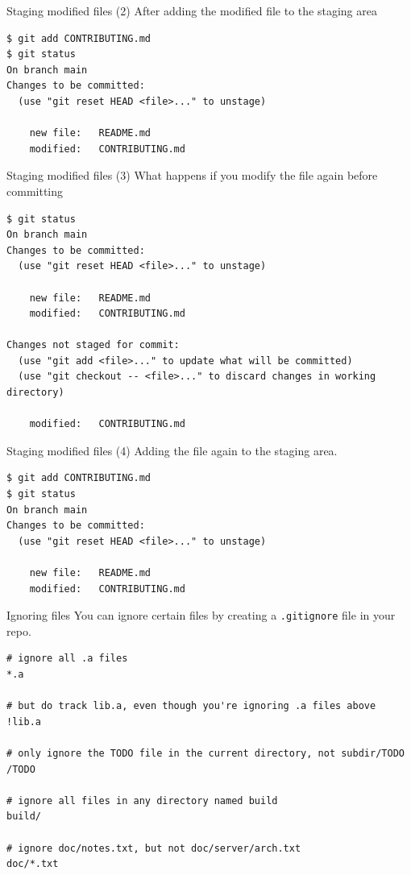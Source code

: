 \documentclass[handout]{beamer}
\begin{document}
\begin{frame}[fragile]{Staging modified files (2)}
After adding the modified file to the staging area
\begin{lstlisting}
$ git add CONTRIBUTING.md
$ git status
On branch main
Changes to be committed:
  (use "git reset HEAD <file>..." to unstage)

    new file:   README.md
    modified:   CONTRIBUTING.md
\end{lstlisting}
\end{frame}

\begin{frame}[fragile]{Staging modified files (3)}
What happens if you modify the file again before committing
\begin{lstlisting}
$ git status
On branch main
Changes to be committed:
  (use "git reset HEAD <file>..." to unstage)

    new file:   README.md
    modified:   CONTRIBUTING.md

Changes not staged for commit:
  (use "git add <file>..." to update what will be committed)
  (use "git checkout -- <file>..." to discard changes in working directory)

    modified:   CONTRIBUTING.md
\end{lstlisting}
\end{frame}

\begin{frame}[fragile]{Staging modified files (4)}
Adding the file again to the staging area.
\begin{lstlisting}
$ git add CONTRIBUTING.md
$ git status
On branch main
Changes to be committed:
  (use "git reset HEAD <file>..." to unstage)

    new file:   README.md
    modified:   CONTRIBUTING.md
\end{lstlisting}
\end{frame}

\begin{frame}[fragile]{Ignoring files}
You can ignore certain files by creating a \texttt{.gitignore} file in your repo. 
\begin{lstlisting}
# ignore all .a files
*.a

# but do track lib.a, even though you're ignoring .a files above
!lib.a

# only ignore the TODO file in the current directory, not subdir/TODO
/TODO

# ignore all files in any directory named build
build/

# ignore doc/notes.txt, but not doc/server/arch.txt
doc/*.txt
\end{lstlisting}
\end{frame}
\end{document}
